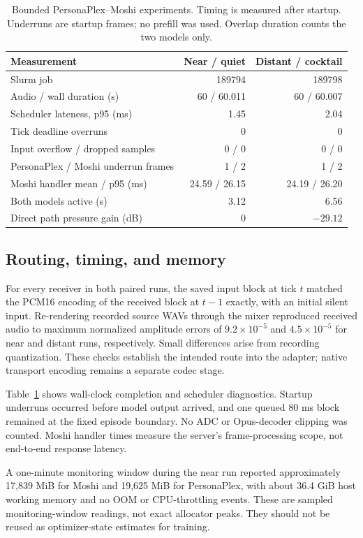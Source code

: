 \documentclass{article}
\begin{document}
\begin{table}[t]
\centering
\caption{Bounded PersonaPlex--Moshi experiments. Timing is measured after startup. Underruns are startup frames; no prefill was used. Overlap duration counts the two models only.}
\label{tab:pair}
\begin{tabular}{lrr}\toprule
Measurement & Near / quiet & Distant / cocktail\\\midrule
Slurm job & 189794 & 189798\\
Audio / wall duration (s) & 60 / 60.011 & 60 / 60.007\\
Scheduler lateness, p95 (ms) & 1.45 & 2.04\\
Tick deadline overruns & 0 & 0\\
Input overflow / dropped samples & 0 / 0 & 0 / 0\\
PersonaPlex / Moshi underrun frames & 1 / 2 & 1 / 2\\
Moshi handler mean / p95 (ms) & 24.59 / 26.15 & 24.19 / 26.20\\
Both models active (s) & 3.12 & 6.56\\
Direct path pressure gain (dB) & 0 & $-29.12$\\\bottomrule
\end{tabular}
\end{table}

\subsection{Routing, timing, and memory}
For every receiver in both paired runs, the saved input block at tick $t$ matched the PCM16 encoding of the received block at $t-1$ exactly, with an initial silent input. Re-rendering recorded source WAVs through the mixer reproduced received audio to maximum normalized amplitude errors of $9.2\times10^{-5}$ and $4.5\times10^{-5}$ for near and distant runs, respectively. Small differences arise from recording quantization. These checks establish the intended route into the adapter; native transport encoding remains a separate codec stage.

Table~\ref{tab:pair} shows wall-clock completion and scheduler diagnostics. Startup underruns occurred before model output arrived, and one queued 80 ms block remained at the fixed episode boundary. No ADC or Opus-decoder clipping was counted. Moshi handler times measure the server's frame-processing scope, not end-to-end response latency.

A one-minute monitoring window during the near run reported approximately 17,839 MiB for Moshi and 19,625 MiB for PersonaPlex, with about 36.4 GiB host working memory and no OOM or CPU-throttling events. These are sampled monitoring-window readings, not exact allocator peaks. They should not be reused as optimizer-state estimates for training.
\end{document}
